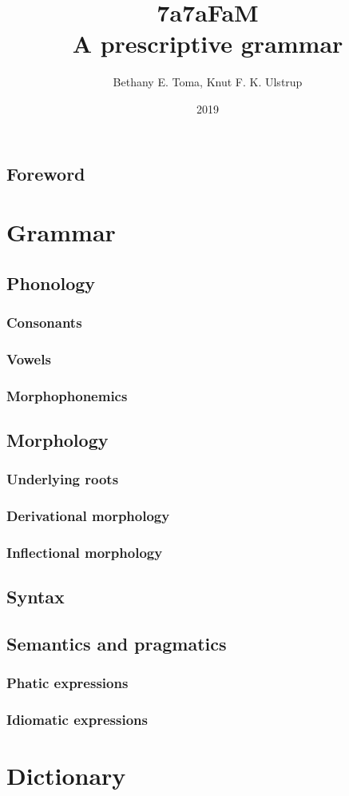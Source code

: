 \documentclass[10pt]{extbook}
\title{7a7aFaM \\ A prescriptive grammar}
\author{Bethany E. Toma, Knut F. K. Ulstrup}
\date{2019}
\begin{document}
\maketitle

\frontmatter

\chapter{Foreword}

\tableofcontents

\mainmatter

\part{Grammar}

\chapter{Phonology}
\section{Consonants}
\section{Vowels}
\section{Morphophonemics}

\chapter{Morphology}
\section{Underlying roots}
\section{Derivational morphology}
\section{Inflectional morphology}

\chapter{Syntax}

\chapter{Semantics and pragmatics}
\section{Phatic expressions}
\section{Idiomatic expressions}

\part{Dictionary}
\end{document}
